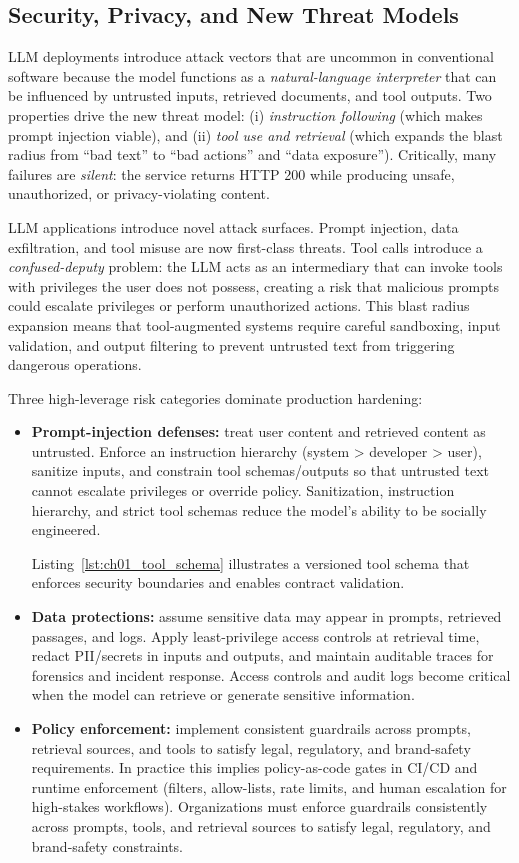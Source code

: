 \subsection{Security, Privacy, and New Threat Models}
LLM deployments introduce attack vectors that are uncommon in conventional software because
the model functions as a \emph{natural-language interpreter} that can be influenced by untrusted
inputs, retrieved documents, and tool outputs. Two properties drive the new threat model:
(i) \emph{instruction following} (which makes prompt injection viable), and (ii) \emph{tool use and retrieval}
(which expands the blast radius from ``bad text'' to ``bad actions'' and ``data exposure'').
Critically, many failures are \emph{silent}: the service returns HTTP 200 while producing unsafe,
unauthorized, or privacy-violating content.

LLM applications introduce novel attack surfaces. Prompt injection, data exfiltration, and tool misuse are now first-class threats. Tool calls introduce a \emph{confused-deputy} problem: the LLM acts as an intermediary that can invoke tools with privileges the user does not possess, creating a risk that malicious prompts could escalate privileges or perform unauthorized actions. This blast radius expansion means that tool-augmented systems require careful sandboxing, input validation, and output filtering to prevent untrusted text from triggering dangerous operations.

Three high-leverage risk categories dominate production hardening:
\begin{itemize}
  \item \textbf{Prompt-injection defenses:} treat user content and retrieved content as untrusted.
  Enforce an instruction hierarchy (system > developer > user), sanitize inputs, and constrain
  tool schemas/outputs so that untrusted text cannot escalate privileges or override policy.
  Sanitization, instruction hierarchy, and strict tool schemas reduce the model's ability to be socially engineered.
  
  Listing~\ref{lst:ch01_tool_schema} illustrates a versioned tool schema that enforces security boundaries and enables contract validation.
  
  \item \textbf{Data protections:} assume sensitive data may appear in prompts, retrieved passages,
  and logs. Apply least-privilege access controls at retrieval time, redact PII/secrets in inputs and
  outputs, and maintain auditable traces for forensics and incident response. Access controls and audit logs become critical when the model can retrieve or generate sensitive information.
  \item \textbf{Policy enforcement:} implement consistent guardrails across prompts, retrieval sources,
  and tools to satisfy legal, regulatory, and brand-safety requirements. In practice this implies
  policy-as-code gates in CI/CD and runtime enforcement (filters, allow-lists, rate limits, and
  human escalation for high-stakes workflows). Organizations must enforce guardrails consistently across prompts, tools, and retrieval sources to satisfy legal, regulatory, and brand-safety constraints.
\end{itemize}

